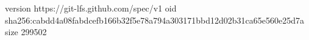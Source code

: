 version https://git-lfs.github.com/spec/v1
oid sha256:cabdd4a08fabdcefb166b32f5e78a794a303171bbd12d02b31ca65e560e25d7a
size 299502

